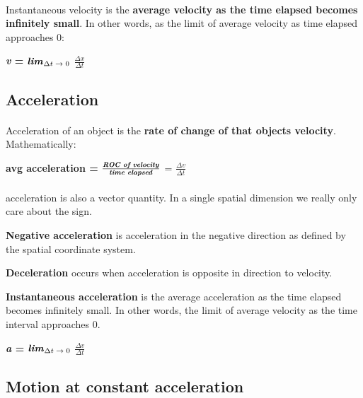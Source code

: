 \documentclass[12pt, a4paper]{article}
\begin{document}
\paragraph*{}
Instantaneous velocity is the \textbf{average velocity as the time elapsed becomes infinitely small}.
In other words, as the limit of average velocity as time elapsed approaches 0:

{
    \centering
    \textbf{\textit{v} = } $\textrm{\textbf{\textit{lim}}}_{\textrm{$\Delta t \rightarrow 0$}}$ 
    \textbf{${\frac{\textrm{$\Delta x$}}{\textrm{$\Delta t$}}}$}

}

\subsection{Acceleration}
\paragraph*{}
Acceleration of an object is the \textbf{rate of change of that objects velocity}. Mathematically:

{
    \centering
    \textbf{avg acceleration =} $\frac{\textbf{\textit{ROC of velocity}}}{\textrm{\textbf{\textit{time elapsed}}}}$ = 
    \textbf{${\frac{\textrm{$\Delta v$}}{\textrm{$\Delta t$}}}$}

} 

\paragraph*{}
acceleration is also a vector quantity. In a single spatial dimension we really only care about
the sign. 

\textbf{Negative acceleration} is acceleration in the negative direction as defined by the spatial coordinate system.

\textbf{Deceleration} occurs when acceleration is opposite in direction to velocity.

\textbf{Instantaneous acceleration} is the average acceleration as the time elapsed becomes infinitely small.
In other words, the limit of average velocity as the time interval approaches 0. 

{
    \centering
    \textbf{\textit{a } = } $\textrm{\textbf{\textit{lim}}}_{\textrm{$\Delta t \rightarrow 0$}}$ 
    \textbf{${\frac{\textrm{$\Delta v$}}{\textrm{$\Delta t$}}}$}

}
\newpage

\subsection{Motion at constant acceleration}
\end{document}

